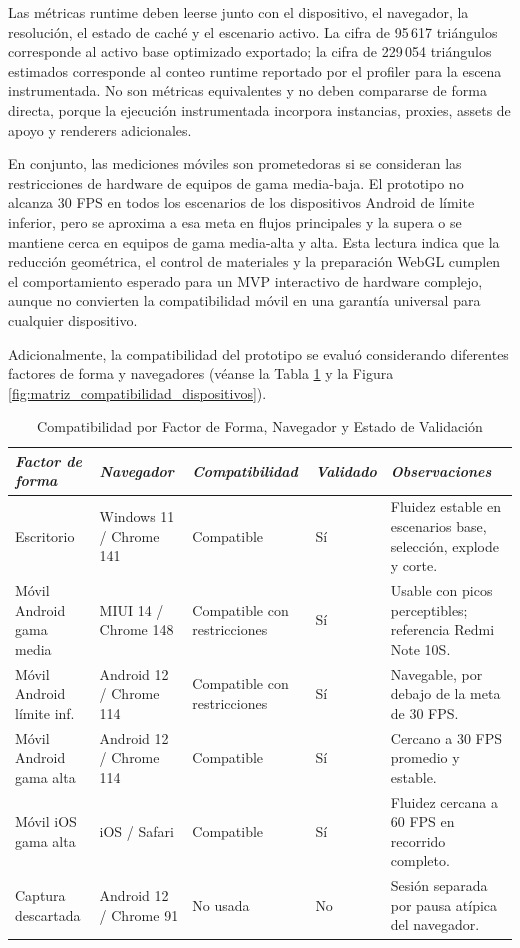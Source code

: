 Las métricas runtime deben leerse junto con el dispositivo, el navegador, la resolución, el estado de caché y el escenario activo. La cifra de 95\,617 triángulos corresponde al activo base optimizado exportado; la cifra de 229\,054 triángulos estimados corresponde al conteo runtime reportado por el profiler para la escena instrumentada. No son métricas equivalentes y no deben compararse de forma directa, porque la ejecución instrumentada incorpora instancias, proxies, assets de apoyo y renderers adicionales.

En conjunto, las mediciones móviles son prometedoras si se consideran las restricciones de hardware de equipos de gama media-baja. El prototipo no alcanza 30 FPS en todos los escenarios de los dispositivos Android de límite inferior, pero se aproxima a esa meta en flujos principales y la supera o se mantiene cerca en equipos de gama media-alta y alta. Esta lectura indica que la reducción geométrica, el control de materiales y la preparación WebGL cumplen el comportamiento esperado para un MVP interactivo de hardware complejo, aunque no convierten la compatibilidad móvil en una garantía universal para cualquier dispositivo.

Adicionalmente, la compatibilidad del prototipo se evaluó considerando diferentes factores de forma y navegadores (véanse la Tabla \ref{tab:compatibilidad_factor_forma} y la Figura \ref{fig:matriz_compatibilidad_dispositivos}).

\begin{table}[htbp]
    \caption{Compatibilidad por Factor de Forma, Navegador y Estado de Validación}
    \label{tab:compatibilidad_factor_forma}
    \begin{tabularx}{\textwidth}{p{2.4cm}p{2.6cm}p{2.8cm}p{1.7cm}X}
        \hline
        \textit{Factor de forma} & \textit{Navegador} & \textit{Compatibilidad} & \textit{Validado} & \textit{Observaciones} \\ \hline
        Escritorio & Windows 11 / Chrome 141 & Compatible & Sí & Fluidez estable en escenarios base, selección, explode y corte. \\
        Móvil Android gama media & MIUI 14 / Chrome 148 & Compatible con restricciones & Sí & Usable con picos perceptibles; referencia Redmi Note 10S. \\
        Móvil Android límite inf. & Android 12 / Chrome 114 & Compatible con restricciones & Sí & Navegable, por debajo de la meta de 30 FPS. \\
        Móvil Android gama alta & Android 12 / Chrome 114 & Compatible & Sí & Cercano a 30 FPS promedio y estable. \\
        Móvil iOS gama alta & iOS / Safari & Compatible & Sí & Fluidez cercana a 60 FPS en recorrido completo. \\
        Captura descartada & Android 12 / Chrome 91 & No usada & No & Sesión separada por pausa atípica del navegador. \\ \hline
    \end{tabularx}
\end{table}

